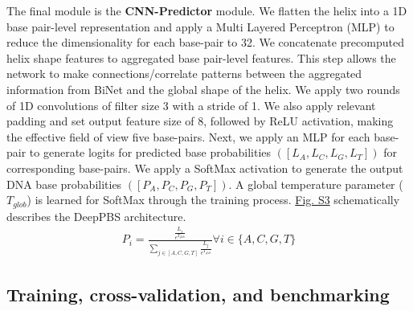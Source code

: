 The final module is the \textbf{CNN-Predictor} module. We flatten the helix into a 1D base pair-level representation and apply a Multi Layered Perceptron (MLP) to reduce the dimensionality for each base-pair to 32. We concatenate precomputed helix shape features to aggregated base pair-level features. This step allows the network to make connections/correlate patterns between the aggregated information from BiNet and the global shape of the helix. We apply two rounds of 1D convolutions of filter size 3 with a stride of 1. We also apply relevant padding and set output feature size of 8, followed by ReLU activation, making the effective field of view five base-pairs. Next, we apply an MLP for each base-pair to generate logits for predicted base probabilities $([L_A,L_C,L_G,L_T])$ for corresponding base-pairs. We apply a SoftMax \citep{Bridle1990} activation to generate the output DNA base probabilities $([P_A,P_C,P_G,P_T])$. A global temperature parameter ($T_{glob}$) is learned for SoftMax through the training process. \hyperref[fig:pdnaS3]{Fig. S3} schematically describes the DeepPBS architecture.
\begin{align}
P_i = \frac{\frac{L_i}{e^{T_{glob}}}}{\sum\limits_{j\in[A,C,G,T]}\frac{L_j}{e^{T_{glob}}}} \forall i \in \{A,C,G,T\}
\end{align}
% 
\subsection{Training, cross-validation, and benchmarking}

